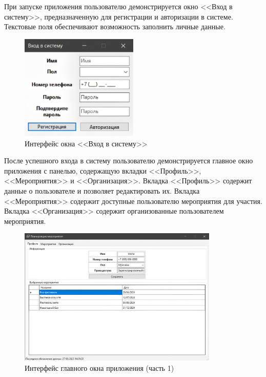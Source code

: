 При запуске приложения пользователю демонстрируется окно <<Вход в систему>>, предназначенную для регистрации и авторизации в системе. Текстовые поля обеспечивают возможность заполнить личные данные.

\newpage

\begin{figure}[h!]
	\centering
	\includegraphics[width=0.5\textwidth]{images/app-enter.png}
	\caption{Интерфейс окна <<Вход в систему>>} 
	\label{fig:app-enter} 
\end{figure}

После успешного входа в систему пользователю демонстрируется главное окно приложения с панелью, содержащую вкладки <<Профиль>>, <<Мероприятия>> и <<Организация>>. Вкладка <<Профиль>> содержит данные о пользователе и позволяет редактировать их. Вкладка <<Мероприятия>> содержит доступные пользователю мероприятия для участия. Вкладка <<Организация>> содержит организованные пользователем мероприятия.

\begin{figure}[h!]
	\centering
	\includegraphics[width=0.85\textwidth]{images/mainwindow-1.png}
	\caption{Интерфейс главного окна приложения (часть 1)} 
	\label{fig:app-mainwindow-1} 
\end{figure}

